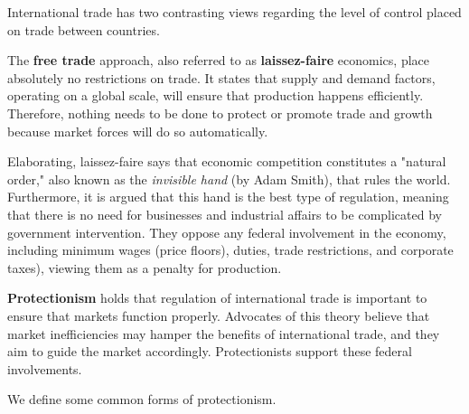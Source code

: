 \documentclass{article}
\begin{document}
  International trade has two contrasting views regarding the level of control placed on trade between countries. 

  \begin{definition}
    \label{def:free-trade}
    The \textbf{free trade} approach, also referred to as \textbf{laissez-faire} economics, place absolutely no restrictions on trade. It states that supply and demand factors, operating on a global scale, will ensure that production happens efficiently. Therefore, nothing needs to be done to protect or promote trade and growth because market forces will do so automatically.

    Elaborating, laissez-faire says that economic competition constitutes a "natural order," also known as the \textit{invisible hand} (by Adam Smith), that rules the world. Furthermore, it is argued that this hand is the best type of regulation, meaning that there is no need for businesses and industrial affairs to be complicated by government intervention. They oppose any federal involvement in the economy, including minimum wages (price floors), duties, trade restrictions, and corporate taxes), viewing them as a penalty for production. 
  \end{definition}

  \begin{definition}[Protectionism]
    \label{def:protectionism}
    \textbf{Protectionism} holds that regulation of international trade is important to ensure that markets function properly. Advocates of this theory believe that market inefficiencies may hamper the benefits of international trade, and they aim to guide the market accordingly. Protectionists support these federal involvements. 
  \end{definition}

  We define some common forms of protectionism. 
\end{document}
